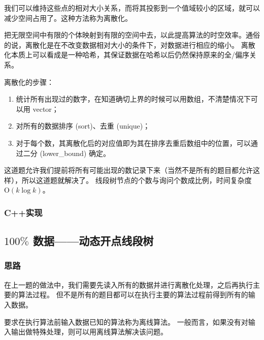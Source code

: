 我们可以维持这些点的相对大小关系，而将其投影到一个值域较小的区域，就可以减少空间占用了。这种方法称为离散化。

\begin{definition}[离散化] \label{def:discretization}
  \hspace{2em}把无限空间中有限的个体映射到有限的空间中去，以此提高算法的时空效率。通俗的说，离散化是在不改变数据相对大小的条件下，对数据进行相应的缩小。
  离散化本质上可以看成是一种哈希，其保证数据在哈希以后仍然保持原来的全/偏序关系。

  \hspace{2em}离散化的步骤：
  \begin{enumerate}
    \item 统计所有出现过的数字，在知道确切上界的时候可以用数组，不清楚情况下可以用 vector；
    \item 对所有的数据排序 (sort)、去重 (unique)；
    \item 对于每个数，其离散化后的对应值即为其在排序去重后数组中的位置，可以通过二分 (lower\_bound) 确定。
  \end{enumerate}

\end{definition}

这道题允许我们提前将所有可能出现的数记录下来（当然不是所有的题目都允许这样），所以这道题就解决了。
线段树节点的个数与询问个数成比例，时间复杂度 $\mathrm{O}(k\log k)$。

\subsubsection{C++实现}



\subsection{\texorpdfstring{$100\%$}{100\%} 数据——动态开点线段树}

\subsubsection{思路}

在上一题的做法中，我们需要先读入所有的数据并进行离散化处理，之后再执行主要的算法过程。
但不是所有的题目都可以在执行主要的算法过程前得到所有的输入数据。

\begin{definition}[离线算法] \label{def:offline algorithm}
  \hspace{2em}要求在执行算法前输入数据已知的算法称为离线算法。
  一般而言，如果没有对输入输出做特殊处理，则可以用离线算法解决该问题。
\end{definition}

